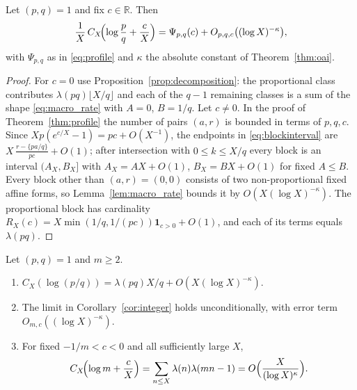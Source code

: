 \begin{theorem}
\label{thm:profile_uncond}
Let $(p,q)=1$ and fix $c\in\mathbb R$. Then
\begin{equation}
\frac1X\,C_X\!\Bigl(\log\frac pq+\frac cX\Bigr)=\Psi_{p,q}(c)+O_{p,q,c}\bigl((\log X)^{-\kappa}\bigr),
\label{eq:profile_uncond}
\end{equation}
with $\Psi_{p,q}$ as in \eqref{eq:profile} and $\kappa$ the absolute constant of Theorem~\ref{thm:oai}.
\end{theorem}

\begin{proof}
For $c=0$ use Proposition~\ref{prop:decomposition}: the proportional class contributes $\lambda(pq)\lfloor X/q\rfloor$ and each of the $q-1$ remaining classes is a sum of the shape \eqref{eq:macro_rate} with $A=0$, $B=1/q$. Let $c\ne0$. In the proof of Theorem~\ref{thm:profile} the number of pairs $(a,r)$ is bounded in terms of $p,q,c$. Since $Xp(e^{c/X}-1)=pc+O(X^{-1})$, the endpoints in \eqref{eq:blockinterval} are $X\,\frac{r-\{pa/q\}}{pc}+O(1)$; after intersection with $0\le k\le X/q$ every block is an interval $(A_X,B_X]$ with $A_X=AX+O(1)$, $B_X=BX+O(1)$ for fixed $A\le B$. Every block other than $(a,r)=(0,0)$ consists of two non-proportional fixed affine forms, so Lemma~\ref{lem:macro_rate} bounds it by $O(X(\log X)^{-\kappa})$. The proportional block has cardinality $R_X(c)=X\min(1/q,1/(pc))\mathbf 1_{c>0}+O(1)$, and each of its terms equals $\lambda(pq)$.
\end{proof}

\begin{corollary}
\label{cor:uncond}
Let $(p,q)=1$ and $m\ge2$.
\begin{enumerate}
\item $C_X(\log(p/q))=\lambda(pq)X/q+O(X(\log X)^{-\kappa})$.
\item The limit in Corollary~\ref{cor:integer} holds unconditionally, with error term $O_{m,c}((\log X)^{-\kappa})$.
\item For fixed $-1/m<c<0$ and all sufficiently large $X$,
\begin{equation}
C_X\!\Bigl(\log m+\frac cX\Bigr)=\sum_{n\le X}\lambda(n)\lambda(mn-1)=O\Bigl(\frac X{(\log X)^{\kappa}}\Bigr).
\label{eq:left_uncond}
\end{equation}
\end{enumerate}
\end{corollary}

